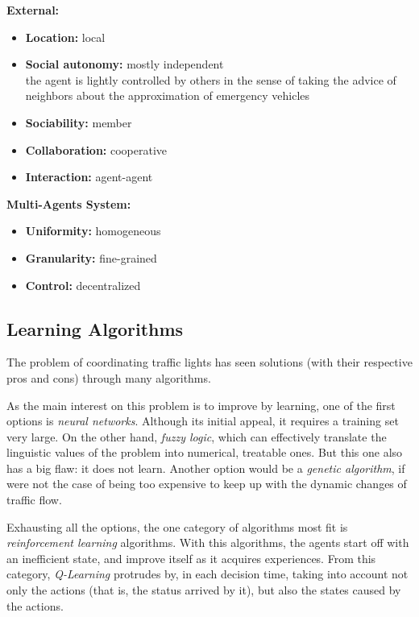 \documentclass[10pt,a4paper]{article}
\begin{document}
	\textbf{External:}
    \begin{itemize}
    \item \textbf{Location:} local
    \item \textbf{Social autonomy:} mostly independent \\
    	the agent is lightly controlled by others in the sense of taking the advice of neighbors about the approximation of emergency vehicles
    \item \textbf{Sociability:} member
    \item \textbf{Collaboration:} cooperative
    \item \textbf{Interaction:} agent-agent
    \end{itemize}
    
    \textbf{Multi-Agents System:}
    \begin{itemize}
    \item \textbf{Uniformity:} homogeneous
    \item \textbf{Granularity:} fine-grained
    \item \textbf{Control:} decentralized
    \end{itemize}

\subsection{Learning Algorithms}
	The problem of coordinating traffic lights has seen solutions (with their respective pros and cons) through many algorithms. 
    
    As the main interest on this problem is to improve by learning, one of the first options is \textit{neural networks}. Although its initial appeal, it requires a training set very large. On the other hand, \textit{fuzzy logic}, which can effectively translate the linguistic values of the problem into numerical, treatable ones. But this one also has a big flaw: it does not learn. Another option would be a \textit{genetic algorithm}, if were not the case of being too expensive to keep up with the dynamic changes of traffic flow. \cite{Oliveira2006} 
    
    Exhausting all the options, the one category of algorithms most fit is \textit{reinforcement learning} algorithms. With this algorithms, the agents start off with an inefficient state, and improve itself as it acquires experiences. From this category, \textit{Q-Learning} protrudes by, in each decision time, taking into account not only the actions (that is, the status arrived by it), but also the states caused by the actions.
\end{document}
